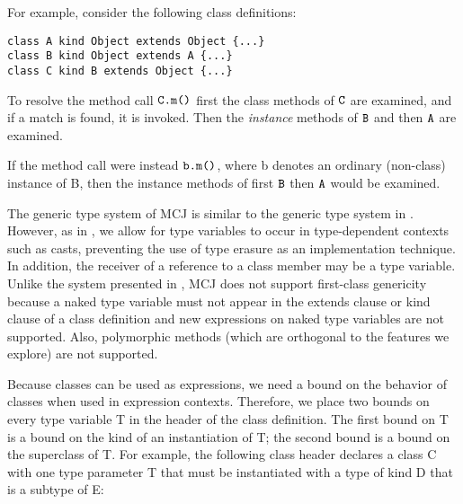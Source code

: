 \documentclass{acm-sigplan}
\begin{document}
For example, consider the following class definitions:

\begin{verbatim}
class A kind Object extends Object {...}
class B kind Object extends A {...}
class C kind B extends Object {...}
\end{verbatim}

To resolve the method call $\mbox{{\ensuremath {\mbox {\tt C}}}{\tt .}{\ensuremath{\mbox {\tt m}\mbox{\tt (}{\overline{{}}}\mbox{\tt )}}}}$ first the class
methods of $\mbox {\tt C}$ are examined, and if a match is found, it is invoked.
Then the \emph{instance} methods of $\mbox {\tt B}$ and then $\mbox {\tt A}$ are examined.

If the method call were instead $\mbox{{\ensuremath {\mbox {\tt b}}}{\tt .}{\ensuremath{\mbox {\tt m}\mbox{\tt (}{\overline{{}}}\mbox{\tt )}}}}$, where {\txt
b} denotes an ordinary (non-class) instance of {\txt B}, then the
instance methods of first $\mbox {\tt B}$ then $\mbox {\tt A}$ would be examined.






The generic type system of MCJ is similar to the generic type system
in \FGJ. However, as in \cite{NextGen, DimUnits}, we allow for type
variables to occur in type-dependent contexts such as casts,
preventing the use of type erasure as an implementation technique. In
addition, the receiver of a reference to a class member may be a type
variable. Unlike the system presented in \cite{MixGen}, MCJ does not
support first-class genericity because a naked type variable must not
appear in the {\txt extends} clause or {\txt kind} clause of a class
definition and {\txt new} expressions on naked type variables are not
supported. Also, polymorphic methods (which are orthogonal to the
features we explore) are not supported.

Because classes can be used as expressions, we need a bound on the
behavior of classes when used in expression contexts.  Therefore, we
place two bounds on every type variable {\txt T} in the header of the
class definition. The first bound on {\txt T} is a bound on the kind
of an instantiation of {\txt T}; the second bound is a bound on the
superclass of {\txt T}. For example, the following class header
declares a class {\txt C} with one type parameter {\txt T} that must
be instantiated with a type of kind {\txt D} that is a subtype of
{\txt E}:
\end{document}
